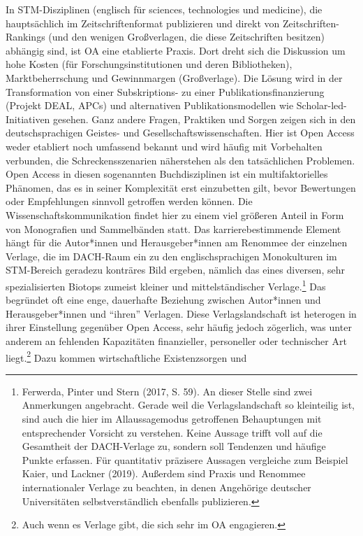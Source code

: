 \documentclass[a4paper,
fontsize=11pt,
oneside,
numbers=noperiodatend,
parskip=half-,
bibliography=totoc,
final
]{scrartcl}
\begin{document}
In STM-Disziplinen (englisch für sciences, technologies und medicine),
die hauptsächlich im Zeitschriftenformat publizieren und direkt von
Zeitschriften-Rankings (und den wenigen Großverlagen, die diese
Zeitschriften besitzen) abhängig sind, ist OA eine etablierte Praxis.
Dort dreht sich die Diskussion um hohe Kosten (für
Forschungsinstitutionen und deren Bibliotheken), Marktbeherrschung und
Gewinnmargen (Großverlage). Die Lösung wird in der Transformation von
einer Subskriptions- zu einer Publikationsfinanzierung (Projekt DEAL,
APCs) und alternativen Publikationsmodellen wie Scholar-led-Initiativen
gesehen. Ganz andere Fragen, Praktiken und Sorgen zeigen sich in den
deutschsprachigen Geistes- und Gesellschaftswissenschaften. Hier ist
Open Access weder etabliert noch umfassend bekannt und wird häufig mit
Vorbehalten verbunden, die Schreckensszenarien näherstehen als den
tatsächlichen Problemen. Open Access in diesen sogenannten
Buchdisziplinen ist ein multifaktorielles Phänomen, das es in seiner
Komplexität erst einzubetten gilt, bevor Bewertungen oder Empfehlungen
sinnvoll getroffen werden können. Die Wissenschaftskommunikation findet
hier zu einem viel größeren Anteil in Form von Monografien und
Sammelbänden statt. Das karrierebestimmende Element hängt für die
Autor*innen und Herausgeber*innen am Renommee der einzelnen Verlage, die
im DACH-Raum ein zu den englischsprachigen Monokulturen im STM-Bereich
geradezu konträres Bild ergeben, nämlich das eines diversen, sehr
spezialisierten Biotops zumeist kleiner und mittelständischer
Verlage.\footnote{Ferwerda, Pinter und Stern (2017, S. 59). An dieser
  Stelle sind zwei Anmerkungen angebracht. Gerade weil die
  Verlagslandschaft so kleinteilig ist, sind auch die hier im
  Allaussagemodus getroffenen Behauptungen mit entsprechender Vorsicht
  zu verstehen. Keine Aussage trifft voll auf die Gesamtheit der
  DACH-Verlage zu, sondern soll Tendenzen und häufige Punkte erfassen.
  Für quantitativ präzisere Aussagen vergleiche zum Beispiel Kaier, und
  Lackner (2019). Außerdem sind Praxis und Renommee internationaler
  Verlage zu beachten, in denen Angehörige deutscher Universitäten
  selbstverständlich ebenfalls publizieren.} Das begründet oft eine
enge, dauerhafte Beziehung zwischen Autor*innen und Herausgeber*innen
und ``ihren'' Verlagen. Diese Verlagslandschaft ist heterogen in ihrer
Einstellung gegenüber Open Access, sehr häufig jedoch zögerlich, was
unter anderem an fehlenden Kapazitäten finanzieller, personeller oder
technischer Art liegt.\footnote{Auch wenn es Verlage gibt, die sich sehr
  im OA engagieren.} Dazu kommen wirtschaftliche Existenzsorgen und
\end{document}
